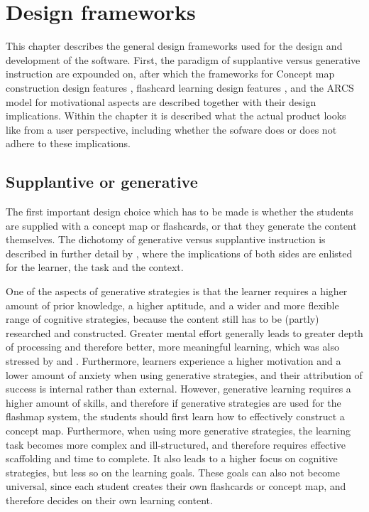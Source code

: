\chapter{Design frameworks}
\label{ch:frameworks}

This chapter describes the general design frameworks used for the design and development of the software. First, the paradigm of supplantive versus generative instruction are expounded on, after which the frameworks for Concept map construction design features \cite{constructcmaps}, flashcard learning design features \cite{nakata}, and the ARCS model for motivational aspects \cite{arcs} are described together with their design implications. Within the  chapter it is described what the actual product looks like from a user perspective, including whether the sofware does or does not adhere to these implications.

    \section{Supplantive or generative}
    \label{sec:suppgen}

The first important design choice which has to be made is whether the students are supplied with a concept map or flashcards, or that they generate the content themselves. The dichotomy of generative versus supplantive instruction is described in further detail by , where the implications of both sides are enlisted for the learner, the task and the context.

One of the aspects of generative strategies is that the learner requires a higher amount of prior knowledge, a higher aptitude, and a wider and more flexible range of cognitive strategies, because the content still has to be (partly) researched and constructed. Greater mental effort generally leads to greater depth of processing and therefore better, more meaningful learning, which was also stressed by  and . Furthermore, learners experience a higher motivation and a lower amount of anxiety when using generative strategies, and their attribution of success is internal rather than external. However, generative learning requires a higher amount of skills, and therefore if generative strategies are used for the flashmap system, the students should first learn how to effectively construct a concept map. Furthermore, when using more generative strategies, the learning task becomes more complex and ill-structured, and therefore requires effective scaffolding and time to complete. It also leads to a higher focus on cognitive strategies, but less so on the learning goals. These goals can also not become universal, since each student creates their own flashcards or concept map, and therefore decides on their own learning content.

